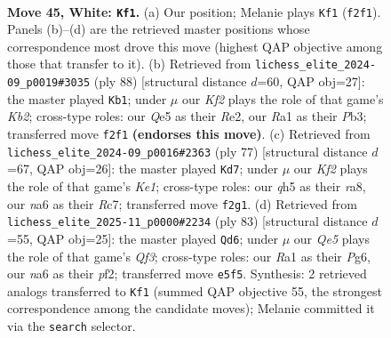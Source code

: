 \documentclass[11pt]{article}
\begin{document}
\clearpage

\begin{figure}[p]\centering
\begin{subfigure}{0.46\textwidth}\centering
\resizebox{\linewidth}{!}{%
\newchessgame
\chessboard[
  setfen={3r2k1/pp6/n2P4/2p1Qp1q/8/P5P1/1P3K2/R2R4 w - - 1 45},
  showmover=false,
  pgfstyle=straightmove, color=movearrow, markmove={f2-f1}
]}
\caption{}
\end{subfigure}\hfill
\begin{subfigure}{0.46\textwidth}\centering
\resizebox{\linewidth}{!}{%
\newchessgame
\chessboard[
  setfen={4r1k1/8/6p1/7p/1P1q4/1P2pQ1P/1K2R1P1/8 w - - 5 45},
  showmover=false,
  pgfstyle=straightmove, color=movearrow, markmove={b2-b1}
]}
\caption{}
\end{subfigure}
\\[4pt]
\begin{subfigure}{0.46\textwidth}\centering
\resizebox{\linewidth}{!}{%
\newchessgame
\chessboard[
  setfen={R3k3/2r2p2/2p3p1/4Ppqp/2QP4/8/5PP1/6K1 b - - 1 39},
  showmover=false,
  pgfstyle=straightmove, color=movearrow, markmove={e8-d7}
]}
\caption{}
\end{subfigure}\hfill
\begin{subfigure}{0.46\textwidth}\centering
\resizebox{\linewidth}{!}{%
\newchessgame
\chessboard[
  setfen={3r2k1/2Q2p2/1P3qp1/8/7p/3p3P/5PP1/3R2K1 b - - 0 42},
  showmover=false,
  pgfstyle=straightmove, color=movearrow, markmove={f6-d6}
]}
\caption{}
\end{subfigure}
\caption{\textbf{Move 45, White: \texttt{Kf1}.} (a) Our position; Melanie plays \texttt{Kf1} (\texttt{f2f1}). Panels (b)--(d) are the retrieved master positions whose correspondence most drove this move (highest QAP objective among those that transfer to it). (b) Retrieved from \texttt{lichess\_elite\_2024-09\_p0019\#3035} (ply 88) [structural distance $d$=60, QAP obj=27]: the master played \texttt{Kb1}; under $\mu$ our \emph{Kf2} plays the role of that game's \emph{Kb2}; cross-type roles: our \emph{Q}e5 as their \emph{R}e2, our \emph{R}a1 as their \emph{P}b3; transferred move \texttt{f2f1} \textbf{(endorses this move)}. (c) Retrieved from \texttt{lichess\_elite\_2024-09\_p0016\#2363} (ply 77) [structural distance $d$=67, QAP obj=26]: the master played \texttt{Kd7}; under $\mu$ our \emph{Kf2} plays the role of that game's \emph{Ke1}; cross-type roles: our \emph{q}h5 as their \emph{r}a8, our \emph{n}a6 as their \emph{R}c7; transferred move \texttt{f2g1}. (d) Retrieved from \texttt{lichess\_elite\_2025-11\_p0000\#2234} (ply 83) [structural distance $d$=55, QAP obj=25]: the master played \texttt{Qd6}; under $\mu$ our \emph{Qe5} plays the role of that game's \emph{Qf3}; cross-type roles: our \emph{R}a1 as their \emph{P}g6, our \emph{n}a6 as their \emph{p}f2; transferred move \texttt{e5f5}. Synthesis: 2 retrieved analogs transferred to \texttt{Kf1} (summed QAP objective 55, the strongest correspondence among the candidate moves); Melanie committed it via the \texttt{search} selector.}
\label{fig:thought-m88}
\end{figure}
\end{document}
